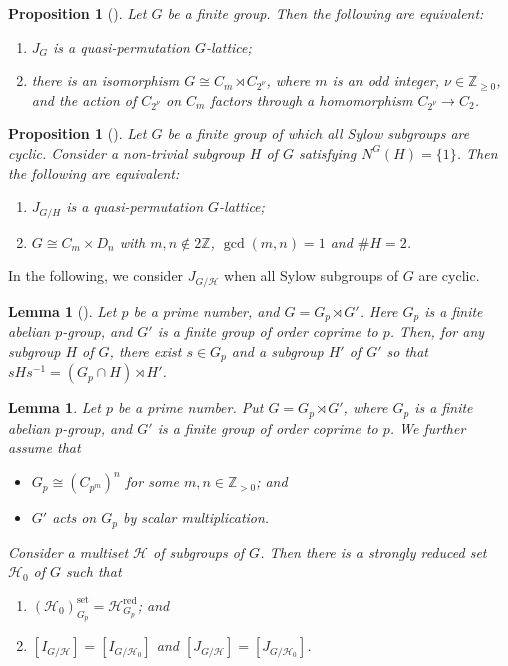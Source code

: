 \documentclass[12pt]{amsart}
\theoremstyle{plain}
\newtheorem{prop}[thm]{Proposition}
\newtheorem{lem}[thm]{Lemma}
\theoremstyle{definition}
\numberwithin{thm}{section}
\numberwithin{equation}{section}
\newcommand{\Zpn}{\mathbb{Z}_{>0}}
\newcommand{\Znn}{\mathbb{Z}_{\geq 0}}
\newcommand{\Z}{\mathbb{Z}}
\newcommand{\cH}{\mathcal{H}}
\DeclareMathOperator{\red}{red}
\DeclareMathOperator{\set}{set}
\begin{document}
\begin{prop}[{\cite[Theorem 2.3]{Endo1975}}]\label{prop:edgp}
Let $G$ be a finite group. Then the following are equivalent: 
\begin{enumerate}
\item $J_{G}$ is a quasi-permutation $G$-lattice; 
\item there is an isomorphism $G\cong C_{m}\rtimes C_{2^{\nu}}$, where $m$ is an odd integer, $\nu \in \Znn$, and the action of $C_{2^{\nu}}$ on $C_{m}$ factors through a homomorphism $C_{2^{\nu}}\rightarrow C_{2}$. 
\end{enumerate}
\end{prop}

\begin{prop}[{\cite[Theorem 3.1]{Endo2011}}]\label{prop:edqp}
Let $G$ be a finite group of which all Sylow subgroups are cyclic. Consider a non-trivial subgroup $H$ of $G$ satisfying $N^{G}(H)=\{1\}$. Then the following are equivalent: 
\begin{enumerate}
\item $J_{G/H}$ is a quasi-permutation $G$-lattice; 
\item $G\cong C_{m}\times D_{n}$ with $m,n\notin 2\Z$, $\gcd(m,n)=1$ and $\#H=2$. 
\end{enumerate}
\end{prop}

In the following, we consider $J_{G/\cH}$ when all Sylow subgroups of $G$ are cyclic. 

\begin{lem}[{\cite[Lemma 5.3 (iii)]{Oki}}]\label{lem:cjsd}
Let $p$ be a prime number, and $G=G_{p}\rtimes G'$. Here $G_{p}$ is a finite abelian $p$-group, and $G'$ is a finite group of order coprime to $p$. Then, for any subgroup $H$ of $G$, there exist $s\in G_{p}$ and a subgroup $H'$ of $G'$ so that $sHs^{-1}=(G_{p}\cap H)\rtimes H'$. 
\end{lem}

\begin{lem}\label{lem:rdos}
Let $p$ be a prime number. Put $G=G_{p}\rtimes G'$, where $G_{p}$ is a finite abelian $p$-group, and $G'$ is a finite group of order coprime to $p$. We further assume that
\begin{itemize}
\item $G_{p}\cong (C_{p^{m}})^{n}$ for some $m,n\in \Zpn$; and
\item $G'$ acts on $G_{p}$ by scalar multiplication. 
\end{itemize}
Consider a multiset $\cH$ of subgroups of $G$. Then there is a strongly reduced set $\cH_{0}$ of $G$ such that
\begin{enumerate}
\item $(\cH_{0})_{G_{p}}^{\set}=\cH_{G_{p}}^{\red}$; and
\item $[I_{G/\cH}]=[I_{G/\cH_{0}}]$ and $[J_{G/\cH}]=[J_{G/\cH_{0}}]$. 
\end{enumerate}
\end{lem}
\end{document}
